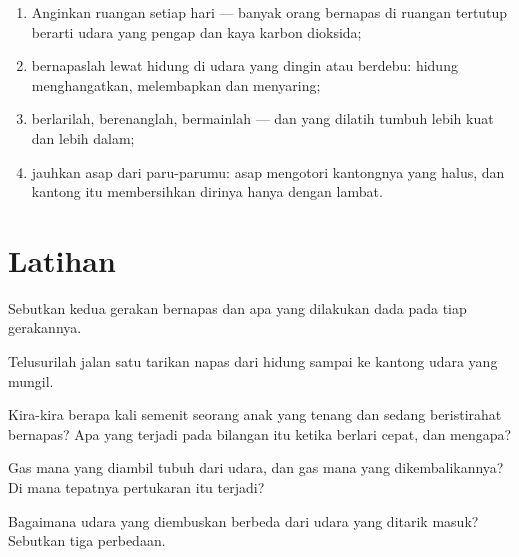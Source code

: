 \begin{method}\label{met:g4:breathing:care}
\begin{enumerate}
  \item Anginkan ruangan setiap hari --- banyak orang bernapas di
        ruangan tertutup berarti udara yang pengap dan kaya karbon
        dioksida;
  \item bernapaslah lewat hidung di udara yang dingin atau berdebu:
        hidung menghangatkan, melembapkan dan menyaring;
  \item berlarilah, berenanglah, bermainlah ---  dan 
         yang dilatih tumbuh lebih kuat dan lebih dalam;
  \item jauhkan asap dari paru-parumu: asap mengotori kantongnya yang
        halus, dan kantong itu membersihkan dirinya hanya dengan
        lambat.
\end{enumerate}
\end{method}

\section{Latihan}

\begin{exercise}[$\star$]\label{exo:g4:breathing:1}
Sebutkan kedua gerakan bernapas dan apa yang dilakukan dada pada tiap
gerakannya.
\end{exercise}

\begin{exercise}[$\star$]\label{exo:g4:breathing:2}
Telusurilah jalan satu tarikan napas dari hidung sampai ke kantong
udara yang mungil.
\end{exercise}

\begin{exercise}[$\star$]\label{exo:g4:breathing:3}
Kira-kira berapa kali semenit seorang anak yang tenang dan sedang
beristirahat bernapas? Apa yang terjadi pada bilangan itu ketika
berlari cepat, dan mengapa?
\end{exercise}

\begin{exercise}[$\star$]\label{exo:g4:breathing:4}
Gas mana yang diambil tubuh dari udara, dan gas mana yang
dikembalikannya? Di mana tepatnya pertukaran itu terjadi?
\end{exercise}

\begin{exercise}[$\star$]\label{exo:g4:breathing:5}
Bagaimana udara yang diembuskan berbeda dari udara yang ditarik masuk?
Sebutkan tiga perbedaan.
\end{exercise}

